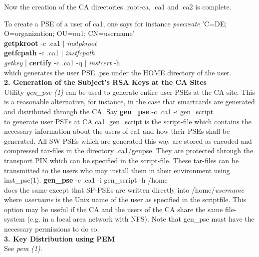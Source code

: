 Now the creation of the CA directories .root-ca, .ca1 and .ca2 is complete.
 
To create a PSE of a user of ca1, one says for instance
\bvtab
\1 {\em psecreate} 'C=DE; O=organization; OU=ou1; CN=username' \\
\1 {\bf getpkroot} -c .ca1 $|$ {\em instpkroot} \\
\1 {\bf getfcpath} -c .ca1 $|$ {\em instfcpath} \\
\1 {\em getkey} $|$ {\bf certify} -c .ca1 -q $|$ {\em instcert} -h \\
\evtab
which generates the user PSE .pse under the HOME directory of the user.
\\ [1em]
{\bf 2. Generation of the Subject's RSA Keys at the CA Sites}
\\ [1em]
Utility {\em gen\_pse (1)} can be used to generate entire user PSEs at the CA
site. This is a reasonable alternative, for instance, in the case that smartcards
are generated and distributed through the CA. Say
\bvtab
\1 {\bf gen\_pse} -c .ca1 -i gen\_script  \\
\evtab
to generate user PSEs at CA ca1. gen\_script is the script-file which contains
the necessary information about the users of ca1 and how their PSEs shall be generated.
All SW-PSEs which are generated this way are stored as encoded and compressed tar-files
in the directory .ca1/genpse. They are protected through the transport PIN which can
be specified in the script-file. These tar-files can be transmitted to the users
who may install them in their environment using inst\_pse(1).
\bvtab
\1 {\bf gen\_pse} -c .ca1 -i gen\_script -h /home \\
\evtab
does the same except that SP-PSEs are written directly into /home/{\em username}
where {\em username} is the Unix name of the user as specified in the scriptfile.
This option may be useful if the CA and the users of the CA share the same
file-system (e.g. in a local area network with NFS). Note that gen\_pse
must have the necessary permissions to do so.
\\ [1em]
{\bf 3. Key Distribution using PEM}
\\ [1em]
See {\em pem (1)}.
